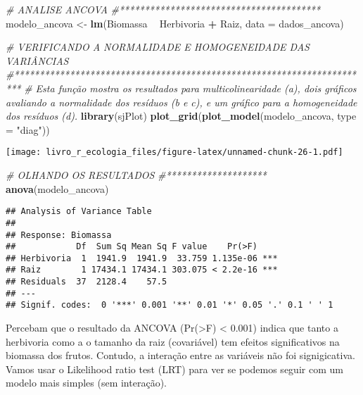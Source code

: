 \documentclass[
]{book}
\newenvironment{Shaded}{\begin{snugshade}}{\end{snugshade}}
\newcommand{\CommentTok}[1]{\textcolor[rgb]{0.56,0.35,0.01}{\textit{#1}}}
\newcommand{\DataTypeTok}[1]{\textcolor[rgb]{0.13,0.29,0.53}{#1}}
\newcommand{\KeywordTok}[1]{\textcolor[rgb]{0.13,0.29,0.53}{\textbf{#1}}}
\newcommand{\NormalTok}[1]{#1}
\newcommand{\OperatorTok}[1]{\textcolor[rgb]{0.81,0.36,0.00}{\textbf{#1}}}
\newcommand{\StringTok}[1]{\textcolor[rgb]{0.31,0.60,0.02}{#1}}
\begin{document}
\begin{Shaded}
\begin{Highlighting}[]
\CommentTok{# ANALISE ANCOVA}
\CommentTok{#****************************************}
\NormalTok{modelo_ancova <-}\StringTok{ }\KeywordTok{lm}\NormalTok{(Biomassa }\OperatorTok{~}\StringTok{ }\NormalTok{Herbivoria }\OperatorTok{+}\StringTok{ }\NormalTok{Raiz, }\DataTypeTok{data =}\NormalTok{ dados_ancova)}

\CommentTok{# VERIFICANDO A NORMALIDADE E HOMOGENEIDADE DAS VARIÂNCIAS}
\CommentTok{#***********************************************************************}
\CommentTok{# Esta função mostra os resultados para multicolinearidade (a), dois gráficos avaliando a normalidade dos resíduos (b e  c), e um gráfico para a homogeneidade dos resíduos (d).}
\KeywordTok{library}\NormalTok{(sjPlot)}
\KeywordTok{plot_grid}\NormalTok{(}\KeywordTok{plot_model}\NormalTok{(modelo_ancova, }\DataTypeTok{type =} \StringTok{"diag"}\NormalTok{))}
\end{Highlighting}
\end{Shaded}

\texttt{[image: livro\_r\_ecologia\_files/figure-latex/unnamed-chunk-26-1.pdf]}

\begin{Shaded}
\begin{Highlighting}[]
\CommentTok{# OLHANDO OS RESULTADOS}
\CommentTok{#********************}
\KeywordTok{anova}\NormalTok{(modelo_ancova)}
\end{Highlighting}
\end{Shaded}

\begin{verbatim}
## Analysis of Variance Table
## 
## Response: Biomassa
##            Df  Sum Sq Mean Sq F value    Pr(>F)    
## Herbivoria  1  1941.9  1941.9  33.759 1.135e-06 ***
## Raiz        1 17434.1 17434.1 303.075 < 2.2e-16 ***
## Residuals  37  2128.4    57.5                      
## ---
## Signif. codes:  0 '***' 0.001 '**' 0.01 '*' 0.05 '.' 0.1 ' ' 1
\end{verbatim}

Percebam que o resultado da ANCOVA (Pr(\textgreater F) \textless{} 0.001) indica que tanto a herbivoria como a o tamanho da raiz (covariável) tem efeitos significativos na biomassa dos frutos. Contudo, a interação entre as variáveis não foi signigicativa. Vamos usar o Likelihood ratio test (LRT) para ver se podemos seguir com um modelo mais simples (sem interação).
\end{document}
